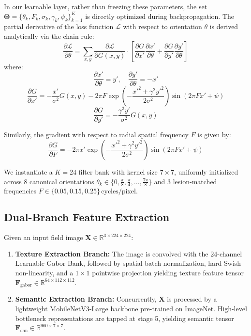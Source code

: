 \documentclass[journal]{IEEEtran}
\begin{document}
In our learnable layer, rather than freezing these parameters, the set $\mathbf{\Theta} = \{\theta_k, F_k, \sigma_k, \gamma_k, \psi_k\}_{k=1}^K$ is directly optimized during backpropagation. The partial derivative of the loss function $\mathcal{L}$ with respect to orientation $\theta$ is derived analytically via the chain rule:
\begin{equation}
    \frac{\partial \mathcal{L}}{\partial \theta} = \sum_{x, y} \frac{\partial \mathcal{L}}{\partial G(x, y)} \cdot \left[ \frac{\partial G}{\partial x'} \frac{\partial x'}{\partial \theta} + \frac{\partial G}{\partial y'} \frac{\partial y'}{\partial \theta} \right]
\end{equation}
where:
\begin{equation}
    \frac{\partial x'}{\partial \theta} = y', \quad \frac{\partial y'}{\partial \theta} = -x'
\end{equation}
\begin{equation}
    \frac{\partial G}{\partial x'} = -\frac{x'}{\sigma^2} G(x, y) - 2\pi F \exp\left(-\frac{{x'}^2 + \gamma^2 {y'}^2}{2\sigma^2}\right) \sin(2\pi F x' + \psi)
\end{equation}
\begin{equation}
    \frac{\partial G}{\partial y'} = -\frac{\gamma^2 y'}{\sigma^2} G(x, y)
\end{equation}

Similarly, the gradient with respect to radial spatial frequency $F$ is given by:
\begin{equation}
    \frac{\partial G}{\partial F} = -2\pi x' \exp\left(-\frac{{x'}^2 + \gamma^2 {y'}^2}{2\sigma^2}\right) \sin(2\pi F x' + \psi)
\end{equation}

We instantiate a $K = 24$ filter bank with kernel size $7 \times 7$, uniformly initialized across 8 canonical orientations $\theta_k \in \{0, \frac{\pi}{8}, \frac{\pi}{4}, \dots, \frac{7\pi}{8}\}$ and 3 lesion-matched frequencies $F \in \{0.05, 0.15, 0.25\}\,\text{cycles/pixel}$.

\subsection{Dual-Branch Feature Extraction}
Given an input field image $\mathbf{X} \in \mathbb{R}^{3 \times 224 \times 224}$:
\begin{enumerate}
    \item \textbf{Texture Extraction Branch:} The image is convolved with the 24-channel Learnable Gabor Bank, followed by spatial batch normalization, hard-Swish non-linearity, and a $1 \times 1$ pointwise projection yielding texture feature tensor $\mathbf{F}_{\text{gabor}} \in \mathbb{R}^{64 \times 112 \times 112}$.
    \item \textbf{Semantic Extraction Branch:} Concurrently, $\mathbf{X}$ is processed by a lightweight MobileNetV3-Large backbone pre-trained on ImageNet. High-level bottleneck representations are tapped at stage 5, yielding semantic tensor $\mathbf{F}_{\text{cnn}} \in \mathbb{R}^{960 \times 7 \times 7}$.
\end{enumerate}
\end{document}
